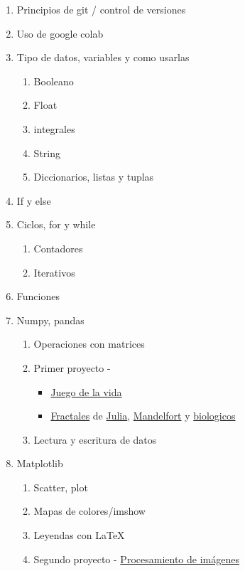 \documentclass[12pt,letterpaper]{article}
\begin{document}
\begin{enumerate}
    \item Principios de git / control de versiones
    \item Uso de google colab
    \item Tipo de datos, variables y como usarlas
    \begin{enumerate}
        \item Booleano
        \item Float
        \item integrales
        \item String
        \item Diccionarios, listas y tuplas
    \end{enumerate}
    \item If y else
    \item Ciclos, for y while
    \begin{enumerate}
        \item Contadores
        \item Iterativos
    \end{enumerate}
    \item Funciones
    \item Numpy, pandas
    \begin{enumerate}
        \item Operaciones con matrices
        \item Primer proyecto - 
        \begin{itemize}
            \item \href{https://en.wikipedia.org/wiki/Conway%27s_Game_of_Life}{Juego de la vida}
            \item \href{https://es.wikipedia.org/wiki/Fractal}{Fractales} de \href{https://es.wikipedia.org/wiki/Conjunto_de_Julia}{Julia}, \href{https://es.wikipedia.org/wiki/Conjunto_de_Mandelbrot}{Mandelfort} y \href{10.13140/RG.2.2.24949.40167}{biologicos}
        \end{itemize}
        \item Lectura y escritura de datos
    \end{enumerate}
    \item Matplotlib
    \begin{enumerate}
        \item Scatter, plot
        \item Mapas de colores/imshow
        \item Leyendas con LaTeX
        \item Segundo proyecto - \href{https://es.wikipedia.org/wiki/Procesamiento_digital_de_im%C3%A1genes}{Procesamiento de imágenes}

\end{enumerate}
\end{enumerate}
\end{document}
